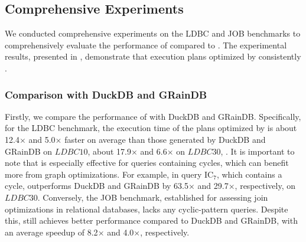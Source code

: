 \subsection{Comprehensive Experiments}
\label{sec:experiment-e2e}

We conducted comprehensive experiments on the LDBC and JOB benchmarks to comprehensively evaluate the performance of \name compared to . The experimental results, presented in , demonstrate that execution plans optimized by \name consistently .

\subsubsection{Comparison with DuckDB and GRainDB}

Firstly, we compare the performance of \name with DuckDB and GRainDB.
Specifically, for the LDBC benchmark, the execution time of the plans optimized by \name is about 12.4$\times$ and 5.0$\times$ faster on average than those generated by DuckDB and GRainDB on $LDBC10$, about 17.9$\times$ and 6.6$\times$ on $LDBC30$, .
It is important to note that \name is especially effective for queries containing cycles, which can benefit more from graph optimizations. For example, in query $\text{IC}_{7}$, which contains a cycle, \name outperforms DuckDB and GRainDB by 63.5$\times$ and 29.7$\times$, respectively, on $LDBC30$.
Conversely, the JOB benchmark, established for assessing join optimizations in relational databases, lacks any cyclic-pattern queries. Despite this, \name still achieves better performance compared to DuckDB and GRainDB, with an average speedup of 8.2$\times$ and 4.0$\times$, respectively.

